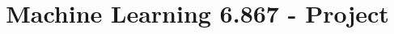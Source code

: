 \documentclass[twoside,11pt]{article}
\begin{document}
\title{Machine Learning 6.867 - Project}

\maketitle










\end{document}
